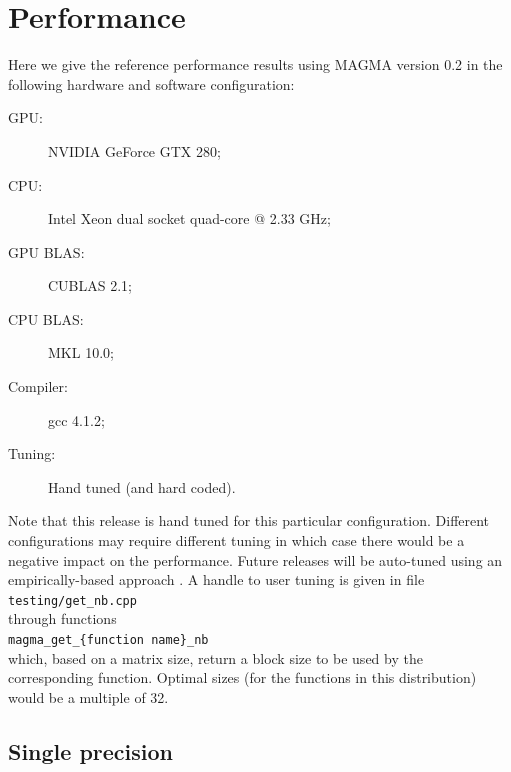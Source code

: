 \documentclass[10pt]{book}
\begin{document}
\chapter{Performance}\label{ch:performance}

Here we give the reference performance results using MAGMA version 0.2 
in the following hardware and software configuration:

\vspace{0.2in}
\begin{description}
\item[GPU:]  NVIDIA GeForce GTX 280;
\item[CPU:] Intel Xeon dual socket quad-core @ 2.33 GHz;
\item[GPU BLAS:] CUBLAS 2.1;
\item[CPU BLAS:] MKL 10.0;
\item[Compiler:] gcc 4.1.2;
\item[Tuning:] Hand tuned (and hard coded).
\end{description}

\vspace{0.2in}
Note that this release is hand tuned for this particular configuration.
Different configurations may require different tuning in which case
there would be a negative impact on the performance.
Future releases will be auto-tuned using an empirically-based 
approach \cite{lawn212}. A handle to user tuning is given in file \\
{\tt testing/get\_nb.cpp} \\
through functions \\
{\tt magma\_get\_\{function name\}\_nb}\\
which, based on a matrix
size, return a block size to be used by the corresponding function.
Optimal sizes (for the functions in this distribution) 
would be a multiple of 32.

\newpage
\section{Single precision}
\end{document}
